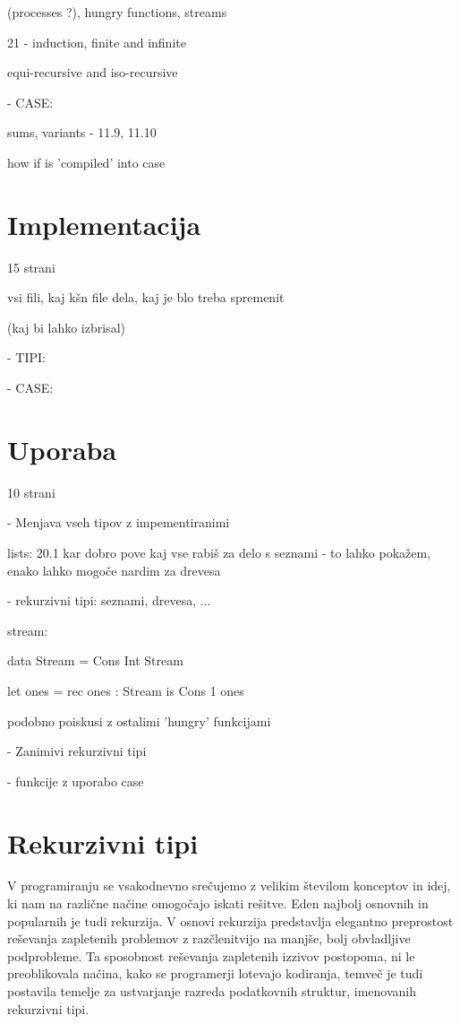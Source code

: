 \documentclass[12pt,a4paper,openany]{book}
\begin{document}
                        (processes ?), hungry functions, streams

    	            	21 - induction, finite and infinite

                        equi-recursive and iso-recursive

- CASE: 

        sums, variants -  11.9, 11.10

        how if is 'compiled' into case

\chapter{Implementacija}
15 strani

vsi fili, kaj kšn file dela, kaj je blo treba spremenit

(kaj bi lahko izbrisal)

- TIPI:

- CASE:

\chapter{Uporaba}
10 strani

- Menjava vseh tipov z impementiranimi

lists: 20.1 kar dobro pove kaj vse rabiš za delo s seznami - to lahko pokažem, enako lahko mogoče nardim za drevesa

- rekurzivni tipi: seznami, drevesa, ...

stream:

data Stream = Cons Int Stream

let ones = rec ones : Stream is Cons 1 ones

podobno poiskusi z ostalimi 'hungry' funkcijami

- Zanimivi rekurzivni tipi

- funkcije z uporabo case


\newpage
\chapter{Rekurzivni tipi} %
V programiranju se vsakodnevno srečujemo z velikim številom konceptov in idej, ki nam na različne načine omogočajo iskati rešitve. Eden najbolj osnovnih in popularnih je tudi rekurzija.
V osnovi rekurzija predstavlja elegantno preprostost reševanja zapletenih problemov z razčlenitvijo na manjše, bolj obvladljive podprobleme. Ta sposobnost reševanja zapletenih izzivov 
postopoma, ni le preoblikovala načina, kako se programerji lotevajo kodiranja, temveč je tudi postavila temelje za ustvarjanje razreda podatkovnih struktur, imenovanih rekurzivni tipi.
\end{document}
